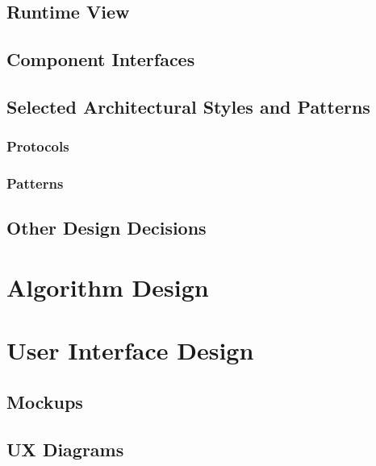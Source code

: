 \documentclass[english]{article}
\begin{document}
\subsection{Runtime View}


\subsection{Component Interfaces}

\subsection{Selected Architectural Styles and Patterns}


\subsubsection{Protocols}

\subsubsection{Patterns}

\subsection{Other Design Decisions}

\newpage

\section{Algorithm Design}


\newpage

\section{User Interface Design}

\subsection{Mockups}

\subsection{UX Diagrams}
\end{document}
